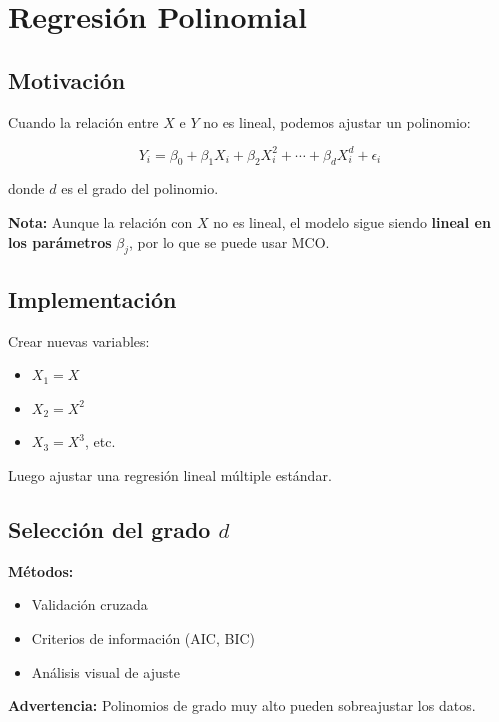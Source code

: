 \documentclass[11pt,a4paper]{article}
\begin{document}
\section{Regresión Polinomial}

\subsection{Motivación}

Cuando la relación entre $X$ e $Y$ no es lineal, podemos ajustar un polinomio:

\begin{equation}
Y_i = \beta_0 + \beta_1 X_i + \beta_2 X_i^2 + \cdots + \beta_d X_i^d + \epsilon_i
\end{equation}

donde $d$ es el grado del polinomio.

\textbf{Nota:} Aunque la relación con $X$ no es lineal, el modelo sigue siendo \textbf{lineal en los parámetros} $\beta_j$, por lo que se puede usar MCO.

\subsection{Implementación}

Crear nuevas variables:
\begin{itemize}
    \item $X_1 = X$
    \item $X_2 = X^2$
    \item $X_3 = X^3$, etc.
\end{itemize}

Luego ajustar una regresión lineal múltiple estándar.

\subsection{Selección del grado $d$}

\textbf{Métodos:}
\begin{itemize}
    \item Validación cruzada
    \item Criterios de información (AIC, BIC)
    \item Análisis visual de ajuste
\end{itemize}

\textbf{Advertencia:} Polinomios de grado muy alto pueden sobreajustar los datos.
\end{document}
